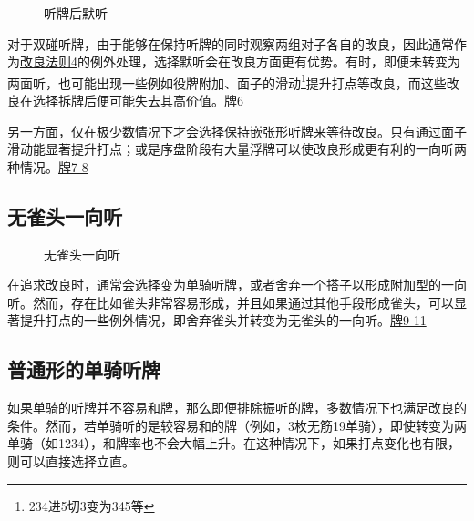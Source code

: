 \begin{figure}
    \caption{听牌后默听} \label{lec3:pai6-8}
    \par\bigskip
    \par\bigskip
\end{figure}

对于双碰听牌，由于能够在保持听牌的同时观察两组对子各自的改良，因此通常作为\hyperref[lec3:改良法则4]{改良法则4}的例外处理，选择默听会在改良方面更有优势。有时，即便未转变为两面听，也可能出现一些例如役牌附加、面子的滑动\footnote{234进5切3变为345等}提升打点等改良，而这些改良在选择拆牌后便可能失去其高价值。\hyperref[lec3:pai6-8]{牌6}

另一方面，仅在极少数情况下才会选择保持嵌张形听牌来等待改良。只有通过面子滑动能显著提升打点；或是序盘阶段有大量浮牌可以使改良形成更有利的一向听两种情况。\hyperref[lec3:pai6-8]{牌7-8}

\subsection{无雀头一向听}
\begin{figure}
    \caption{无雀头一向听} \label{lec3:pai9-11}
    \par\bigskip
    \par\bigskip
\end{figure}

在追求改良时，通常会选择变为单骑听牌，或者舍弃一个搭子以形成附加型的一向听。然而，存在比如雀头非常容易形成，并且如果通过其他手段形成雀头，可以显著提升打点的一些例外情况，即舍弃雀头并转变为无雀头的一向听。\hyperref[lec3:pai9-11]{牌9-11}

\subsection{普通形的单骑听牌}
如果单骑的听牌并不容易和牌，那么即便排除振听的牌，多数情况下也满足改良的条件。然而，若单骑听的是较容易和的牌（例如，3枚无筋19单骑），即使转变为两单骑（如1234），和牌率也不会大幅上升。在这种情况下，如果打点变化也有限，则可以直接选择立直。

